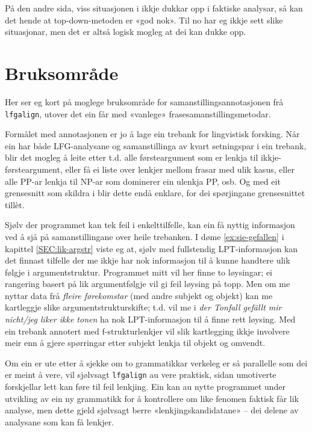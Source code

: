 \documentclass[12pt,a4paper,oneside,draft]{report}
\begin{document}
På den andre sida, viss situasjonen i \Last ikkje dukkar opp i
 faktiske analysar, så kan det hende at top-down-metoden er «god
 nok». Til no har eg ikkje sett slike situasjonar, men det er altså
 logisk mogleg at dei kan dukke opp.

\section{Bruksområde}
\label{sec-5.5}


Her ser eg kort på moglege bruksområde for samanstillingsannotasjonen
 frå \texttt{lfgalign}, utover det ein får med «vanlege»
 frasesamanstillingsmetodar.

Formålet med annotasjonen er jo å lage ein trebank for lingvistisk
 forsking. Når ein har både LFG-analysane og samanstillinga av kvart
 setningspar i ein trebank, blir det mogleg å leite etter t.d. alle
 førsteargument som er lenkja til ikkje-førsteargument, eller få ei
 liste over lenkjer mellom frasar med ulik kasus, eller alle PP-ar
 lenkja til NP-ar som dominerer ein ulenkja PP, osb. Og med eit
 grensesnitt som skildra i \citet{dyvik2009lmp} blir dette endå
 enklare, for dei spørjingane grensesnittet tillèt.
 
Sjølv der programmet kan tek feil i enkelttilfelle, kan ein få nyttig
 informasjon ved å sjå på samanstillingane over heile trebanken.  I
 døme \ref{ex:sie-gefallen} i kapittel \ref{SEC:lik-argstr} viste eg
 at, sjølv med fullstendig LPT-informasjon kan det finnast tilfelle
 der me ikkje har nok informasjon til å kunne handtere ulik følgje i
 argumentstruktur. Programmet mitt vil her finne to løysingar; ei
 rangering basert på lik argumentfølgje vil gi feil løysing på topp.
 Men om me nyttar data frå \emph{fleire førekomstar} (med andre subjekt og
 objekt) kan me kartleggje slike argumentstrukturskifte; t.d. vil me i
 \emph{der Tonfall gefällt mir nicht/jeg liker ikke tonen} ha nok
 LPT-informasjon til å finne rett løysing. Med ein trebank annotert
 med f-strukturlenkjer vil slik kartlegging ikkje involvere meir enn å
 gjere spørringar etter subjekt lenkja til objekt og omvendt.

Om ein er ute etter å sjekke om to grammatikkar verkeleg er så
 parallelle som dei er meint å vere, vil sjølvsagt \texttt{lfgalign} au vere
 praktisk, sidan umotiverte forskjellar lett kan føre til feil
 lenkjing. Ein kan au nytte programmet under utvikling av ein ny
 grammatikk for å kontrollere om like fenomen faktisk får lik analyse,
 men dette gjeld sjølvsagt berre «lenkjingskandidatane» -- dei delene
 av analysane som kan få lenkjer.
\end{document}
